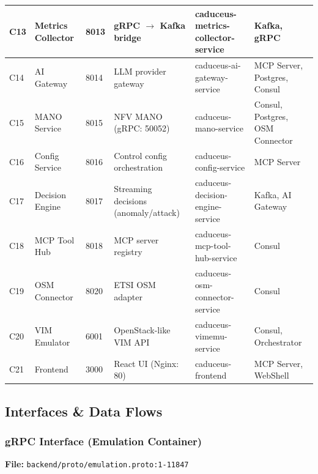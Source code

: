 \documentclass[10pt,a4paper]{article}
\begin{document}
\begin{longtable}{p{0.8cm}p{3cm}p{1cm}p{5cm}p{3cm}p{3cm}}
C13 & Metrics Collector & 8013 & gRPC $\to$ Kafka bridge & caduceus-metrics-collector-service & Kafka, gRPC \\ \midrule
C14 & AI Gateway & 8014 & LLM provider gateway & caduceus-ai-gateway-service & MCP Server, Postgres, Consul \\ \midrule
C15 & MANO Service & 8015 & NFV MANO (gRPC: 50052) & caduceus-mano-service & Consul, Postgres, OSM Connector \\ \midrule
C16 & Config Service & 8016 & Control config orchestration & caduceus-config-service & MCP Server \\ \midrule
C17 & Decision Engine & 8017 & Streaming decisions (anomaly/attack) & caduceus-decision-engine-service & Kafka, AI Gateway \\ \midrule
C18 & MCP Tool Hub & 8018 & MCP server registry & caduceus-mcp-tool-hub-service & Consul \\ \midrule
C19 & OSM Connector & 8020 & ETSI OSM adapter & caduceus-osm-connector-service & Consul \\ \midrule
C20 & VIM Emulator & 6001 & OpenStack-like VIM API & caduceus-vimemu-service & Consul, Orchestrator \\ \midrule
C21 & Frontend & 3000 & React UI (Nginx: 80) & caduceus-frontend & MCP Server, WebShell \\
\bottomrule
\end{longtable}

\subsection{Interfaces \& Data Flows}

\subsubsection{gRPC Interface (Emulation Container)}

\textbf{File:} \texttt{backend/proto/emulation.proto:1-11847}
\end{document}
